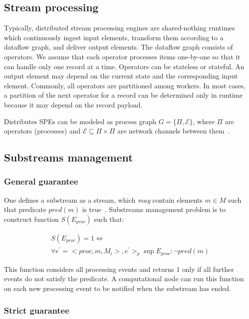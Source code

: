 \label{fs-acker-preliminaries}

\subsection{Stream processing}

Typically, distributed stream processing engines are shared-nothing runtimes which continuously ingest input elements, transform them according to a dataflow graph, and deliver output elements. The dataflow graph consists of operators. We assume that each operator processes items one-by-one so that it can handle only one record at a time. Operators can be stateless or stateful. An output element may depend on the current state and the corresponding input element. Commonly, all operators are partitioned among workers. In most cases, a partition of the next operator for a record can be determined only in runtime because it may depend on the record payload. 

Distributes SPEs can be modeled as process graph $G=\{\Pi,\mathcal{E}\}$, where $\Pi$ are operators (processes) and $\mathcal{E} \subseteq \Pi \times \Pi$ are network channels between them~\cite{carbone2018scalable}. 

\subsection{Substreams management}

\subsubsection{General guarantee}

One defines a substream as a stream, which {\em may} contain elements $m \in M$ such that predicate $pred(m)$ is true~\cite{Tucker:2003:EPS:776752.776780}. Substreams management problem is to construct function $S(E_{proc})$ such that:

\begin{align*}
& S(E_{proc}) = 1 \Longleftrightarrow \\ 
& \forall e^{'} = <proc,m,M_i>, e^{'} >_p \sup E_{proc} : \neg pred(m)
\end{align*}

This function considers all processing events and returns $1$ only if all further events do not satisfy the predicate. A computational node can run this function on each new processing event to be notified when the substream has ended.

\subsubsection{Strict guarantee}

